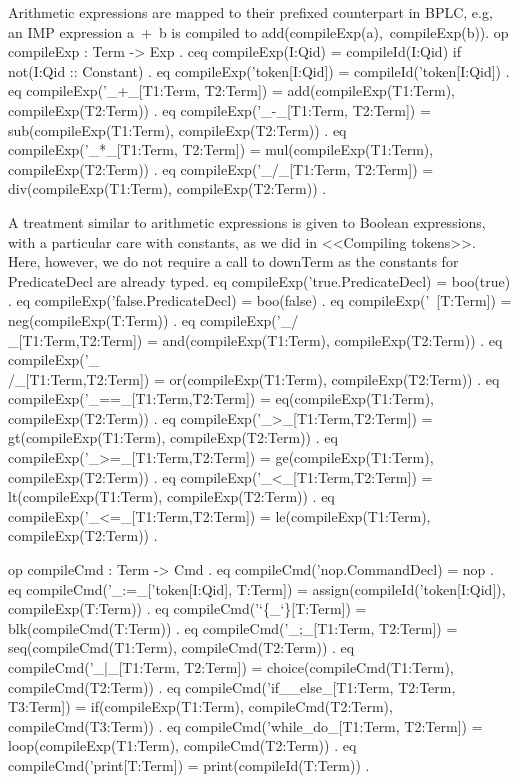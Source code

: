 \documentclass{llncs}%
\begin{document}
Arithmetic expressions are mapped to their prefixed counterpart in BPLC, e.g, an IMP expression {\Tt{}a\ +\ b\nwendquote} is compiled to {\Tt{}add(compileExp(a),\ compileExp(b))\nwendquote}.
\nwenddocs{}\endmoddef\nwstartdeflinemarkup\nwenddeflinemarkup
 op compileExp : Term -> Exp .
 ceq compileExp(I:Qid) = compileId(I:Qid) 
  if not(I:Qid :: Constant) .
 eq compileExp('token[I:Qid]) = compileId('token[I:Qid]) .
 eq compileExp('_+_[T1:Term, T2:Term]) =
     add(compileExp(T1:Term), compileExp(T2:Term)) .
 eq compileExp('_-_[T1:Term, T2:Term]) =
     sub(compileExp(T1:Term), compileExp(T2:Term)) .
 eq compileExp('_*_[T1:Term, T2:Term]) =
     mul(compileExp(T1:Term), compileExp(T2:Term)) .
 eq compileExp('_/_[T1:Term, T2:Term]) =
     div(compileExp(T1:Term), compileExp(T2:Term)) .
\nwendcode{}\nwdocspar

A treatment similar to arithmetic expressions is given to Boolean expressions, with a particular care with constants, as we did in  <<Compiling tokens>>. Here, however, we do not require a call to {\Tt{}downTerm\nwendquote} as the constants for {\Tt{}PredicateDecl\nwendquote} are already typed.
\nwenddocs{}\endmoddef\nwstartdeflinemarkup\nwenddeflinemarkup
 eq compileExp('true.PredicateDecl) = boo(true) .
 eq compileExp('false.PredicateDecl) = boo(false) .
 eq compileExp('~[T:Term]) = neg(compileExp(T:Term)) .
 eq compileExp('_/\\_[T1:Term,T2:Term]) = 
    and(compileExp(T1:Term), compileExp(T2:Term)) .
 eq compileExp('_\\/_[T1:Term,T2:Term]) = 
    or(compileExp(T1:Term), compileExp(T2:Term)) .
 eq compileExp('_==_[T1:Term,T2:Term]) = 
    eq(compileExp(T1:Term), compileExp(T2:Term)) .
 eq compileExp('_>_[T1:Term,T2:Term]) = 
    gt(compileExp(T1:Term), compileExp(T2:Term)) .
 eq compileExp('_>=_[T1:Term,T2:Term]) = 
    ge(compileExp(T1:Term), compileExp(T2:Term)) .
 eq compileExp('_<_[T1:Term,T2:Term]) =  
    lt(compileExp(T1:Term), compileExp(T2:Term)) .
 eq compileExp('_<=_[T1:Term,T2:Term]) = 
    le(compileExp(T1:Term), compileExp(T2:Term)) .
\nwendcode{}\nwdocspar

\nwenddocs{}\endmoddef\nwstartdeflinemarkup\nwenddeflinemarkup
 op compileCmd : Term -> Cmd .
 eq compileCmd('nop.CommandDecl) = nop .
 eq compileCmd('_:=_['token[I:Qid], T:Term]) =
    assign(compileId('token[I:Qid]), compileExp(T:Term)) .
 eq compileCmd('`\{_`\}[T:Term]) = blk(compileCmd(T:Term)) .
 eq compileCmd('_;_[T1:Term, T2:Term]) =
    seq(compileCmd(T1:Term), compileCmd(T2:Term)) .
 eq compileCmd('_|_[T1:Term, T2:Term]) =
    choice(compileCmd(T1:Term), compileCmd(T2:Term)) .
 eq compileCmd('if__else_[T1:Term, T2:Term, T3:Term]) =
    if(compileExp(T1:Term), compileCmd(T2:Term), 
       compileCmd(T3:Term)) .
 eq compileCmd('while_do_[T1:Term, T2:Term]) =
    loop(compileExp(T1:Term), compileCmd(T2:Term)) .
 eq compileCmd('print[T:Term]) = print(compileId(T:Term)) .
\end{document}
